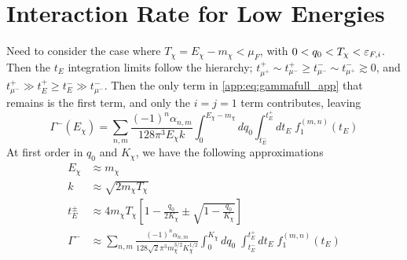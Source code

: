 \section{Interaction Rate for Low Energies}

Need to consider the case where $T_\chi = E_\chi - m_\chi <\mu_{F}$, with $0<q_0<T_\chi<\varepsilon_{F,i}$. Then the $t_E$ integration limits follow the hierarchy; $t_{\mu^{+}}^{+} \sim t_{\mu^{-}}^{+} \ge t_{\mu^{-}}^{-} \sim t_{\mu^{+}}^{-} \gtrsim 0$, and $t_{\mu^{-}}^{+} \gg t_E^+ \ge t_E^- \gg t_{\mu^{-}}^{-}$. Then the only term in \ref{app:eq:gammafull_app} that remains is the first term, and only the $i=j=1$ term contributes, leaving
\begin{equation}
    \Gamma^-(E_\chi) = \sum_{n,m}  \frac{(-1)^n \alpha_{n,m}}{128\pi^3 E_\chi k }\int_0^{E_\chi -m_\chi} dq_0\int_{t_E^-}^{t_E^+} d t_E\; f_1^{(m,n)}(t_E)
\end{equation}
At first order in $q_0$ and $K_\chi$, we have the following approximations
\begin{align}
    E_\chi &\approx m_\chi\\
    k &\approx \sqrt{2m_\chi T_\chi}\\
    t_E^\pm &\approx 4m_\chi T_\chi \left[ 1 - \frac{q_0}{2 K_\chi}\pm \sqrt{1 - \frac{q_0}{K_\chi}} \right]\\
    \Gamma^- & \approx \sum_{n,m}\frac{(-1)^n \alpha_{n,m}}{128\sqrt{2} \pi^3 m_\chi^{3/2}K_\chi^{1/2}}\int_0^{K_\chi} dq_0\;\int_{t_E^-}^{t_E^+} dt_E\;f_1^{(m,n)}(t_E)
\end{align}

